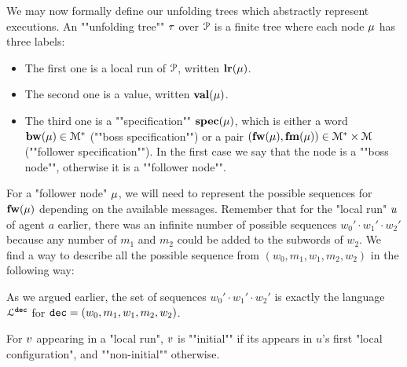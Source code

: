 We may now formally define our unfolding trees which abstractly represent executions. 
\AP An ""unfolding tree"" $\tau$ over $\mathcal{P}$ is
a finite tree where each node $\mu$ has three labels:
\begin{itemize}
	\item The first one is a local run of $\mathcal{P}$, written $\mathbf{lr}(\mu)$. 
	
	\item The second one is a value, written $\mathbf{val}(\mu)$.
	
	\item The third one is a ""specification"" $\mathbf{spec}(\mu)$, which is either a word $\mathbf{bw}(\mu) \in \mathcal{M}^*$ (""boss specification"") or a pair $(\mathbf{fw}(\mu), \mathbf{fm}(\mu)) \in \mathcal{M}^* \times \mathcal{M}$ (""follower specification""). In the first case we say that the node is a ""boss node"", otherwise it is a ""follower node"".
\end{itemize} 


For a "follower node" $\mu$, we will need to represent the possible sequences for $\mathbf{fw}(\mu)$ depending on the available messages. Remember that for the "local run" $u$ of agent $a$ earlier, there was an infinite number of possible sequences $w_0' \cdot w_1' \cdot w_2'$ because any number of $m_1$ and $m_2$ could be added to the subwords of $w_2$. We find a way to describe all the possible sequence from $(w_0, m_1, w_1, m_2, w_2)$ in the following way:


As we argued earlier, the set of sequences $w_0' \cdot w_1' \cdot w_2'$ is exactly the language $\mathcal{L}^{\mathtt{\mathtt{dec}}}$ for $\mathtt{dec} = (w_0, m_1, w_1, m_2, w_2)$.

For $v$ appearing in a "local run", $v$ is ""initial"" if its appears in $u$'s first "local configuration", and ""non-initial"" otherwise. 


